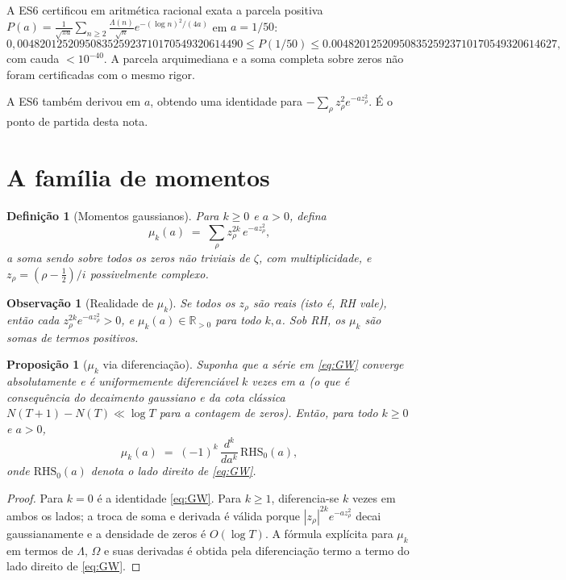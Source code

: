 \documentclass[12pt,a4paper]{article}
\newtheorem{proposicao}{Proposição}
\newtheorem{observacao}{Observação}
\newtheorem{definicao}{Definição}
\begin{document}
A ES6 certificou em aritmética racional exata a parcela positiva
$P(a)=\frac1{\sqrt{\pi a}}\sum_{n\ge2}\frac{\Lambda(n)}{\sqrt n}
e^{-(\log n)^2/(4a)}$ em $a=1/50$:
\[
0{,}0048201252095083525923710170549320614490
\le P(1/50) \le
0.0048201252095083525923710170549320614627,
\]
com cauda $<10^{-40}$. A parcela arquimediana e a soma completa sobre
zeros não foram certificadas com o mesmo rigor.

A ES6 também derivou em $a$, obtendo uma identidade para
$-\sum_\rho z_\rho^2 e^{-az_\rho^2}$. É o ponto de partida desta nota.

\section{A família de momentos}

\begin{definicao}[Momentos gaussianos]
Para $k\ge 0$ e $a>0$, defina
\[
  \mu_k(a) \;=\; \sum_{\rho} z_\rho^{2k}\,e^{-az_\rho^2},
\]
a soma sendo sobre \emph{todos} os zeros não triviais de $\zeta$, com
multiplicidade, e $z_\rho=(\rho-\tfrac12)/i$ possivelmente complexo.
\end{definicao}

\begin{observacao}[Realidade de $\mu_k$]
Se todos os $z_\rho$ são reais (isto é, RH vale), então cada
$z_\rho^{2k} e^{-az_\rho^2} > 0$, e $\mu_k(a)\in\mathbb{R}_{>0}$ para
todo $k,a$. Sob RH, os $\mu_k$ são somas de termos positivos.
\end{observacao}

\begin{proposicao}[$\mu_k$ via diferenciação]\label{prop:deriv}
Suponha que a série em \eqref{eq:GW} converge absolutamente e é
uniformemente diferenciável $k$ vezes em $a$ (o que é consequência do
decaimento gaussiano e da cota clássica $N(T+1)-N(T)\ll\log T$ para a
contagem de zeros). Então, para todo $k\ge 0$ e $a>0$,
\[
  \mu_k(a) \;=\; (-1)^k\,\frac{d^k}{da^k}\,\mathrm{RHS}_0(a),
\]
onde $\mathrm{RHS}_0(a)$ denota o lado direito de \eqref{eq:GW}.
\end{proposicao}

\begin{proof}
Para $k=0$ é a identidade \eqref{eq:GW}. Para $k\ge 1$, diferencia-se
$k$ vezes em ambos os lados; a troca de soma e derivada é válida
porque $|z_\rho|^{2k}e^{-a z_\rho^2}$ decai gaussianamente e a densidade
de zeros é $O(\log T)$. A fórmula explícita para $\mu_k$ em termos de
$\Lambda$, $\Omega$ e suas derivadas é obtida pela diferenciação
termo a termo do lado direito de \eqref{eq:GW}.
\end{proof}
\end{document}
